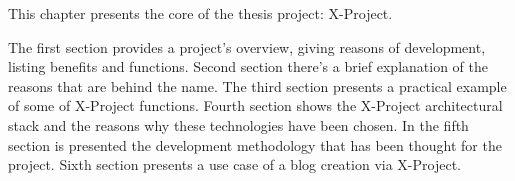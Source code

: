 This chapter presents the core of the thesis project: X-Project.

The first section provides a project's overview, giving reasons of development, listing benefits and functions. Second section there's a brief explanation of the reasons that are behind the name. The third section presents a practical example of some of X-Project functions. Fourth section shows the X-Project architectural stack and the reasons why these technologies have been chosen. In the fifth section is presented the development methodology that has been thought for the project. Sixth section presents a use case of a blog creation via X-Project.